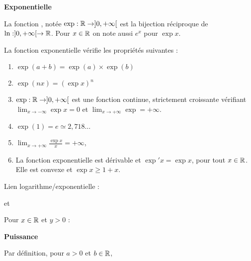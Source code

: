 \documentclass[10pt,class=article,crop=false]{standalone}
\begin{document}
\begin{multicols}{2}
\textbf{Exponentielle}

La fonction , notée $\exp : \mathbb{R} \to   ]0,+\infty[$ est la bijection réciproque de $\ln : ]0,+\infty[ \to \mathbb{R}$.
Pour $x \in \mathbb{R}$ on note aussi $e^x$ pour $\exp x$.





\begin{proposition}
	La fonction exponentielle vérifie les propriétés suivantes :
	\begin{enumerate}
		
		\item $\exp(a+b) = \exp(a) \times \exp(b)$
		
		\item $\exp(nx) = (\exp x)^n$
		
		\item $\exp : \mathbb{R} \to   ]0,+ \infty[$ est une fonction continue, strictement croissante vérifiant
		$\lim_{x\to-\infty} \exp x = 0$ et $\lim_{x\to +\infty} \exp = +\infty$.
		
		\item $\exp(1) = e \simeq 2,718\ldots$
		
		\item $\lim_{x\to +\infty} \frac{\exp x}{x} = +\infty$,
		
		\item La fonction exponentielle est dérivable et $\exp' x = \exp x$, pour tout $x\in \mathbb{R}$. 
		Elle est convexe et $\exp x \ge 1+x$.
	\end{enumerate}
	
\end{proposition}

Lien logarithme/exponentielle :

 et

Pour $x \in \mathbb{R}$ et $y>0$ :

\textbf{Puissance}

Par définition, pour $a>0$ et $b\in \mathbb{R}$,


\end{multicols}
\end{document}
